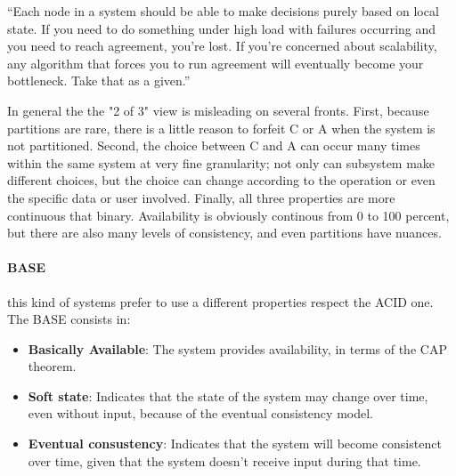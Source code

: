 \documentclass[12pt]{article}
\begin{document}
\bigskip
``Each node in a system should be able to make decisions purely based on local state. If you need to do something under high load with failures occurring and you need to reach agreement, you’re lost. If you’re concerned about scalability, any algorithm that forces you to run agreement will eventually become your bottleneck. Take that as a given.''\\
\bigskip

In general the the "2 of 3" view is misleading on several fronts. First, because partitions are rare, there is a little reason to forfeit C or A when the system is not partitioned. Second, the choice between C and A can occur many times within the same system at very fine granularity; not only can subsystem make different choices, but the choice can change according to the operation or even the specific data or user involved. Finally, all three properties are more continuous that binary. Availability is obviously continous from 0 to 100 percent, but there are also many levels of consistency, and even partitions have nuances.

\paragraph{BASE} this kind of systems prefer to use a different properties respect the ACID one. The BASE consists in:
\begin{itemize}
  \item \textbf{Basically Available}: The system provides availability, in terms of the CAP theorem.
  \item \textbf{Soft state}: Indicates that the state of the system may change over time, even without input, because of the eventual consistency model.
  \item \textbf{Eventual consustency}: Indicates that the system will become consistenct over time, given that the system doesn't receive input during that time.
\end{itemize}
\end{document}
